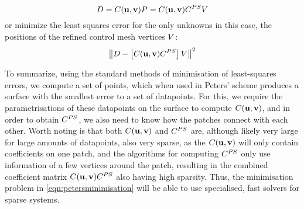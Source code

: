 \begin{equation}
\lsDataPointMatrix = \lsControlPointCoefMatrix(\vec{u},\vec{v})\lsControlPointMatrix = \lsControlPointCoefMatrix(\vec{u},\vec{v})\petersControlPointCoefMatrix\petersPatchPointMatrix
\end{equation}
or minimize the least squares error for the only unknowns in this case, the positions of the refined control mesh vertices $\petersPatchPointMatrix$:
\begin{equation}
\norm{\lsDataPointMatrix - \left [\lsControlPointCoefMatrix(\vec{u},\vec{v})\petersControlPointCoefMatrix\right ]\petersPatchPointMatrix}^2
\label{eqn:petersminimisation}
\end{equation}

To summarize, using the standard methods of minimisation of least-squares errors, we compute a set of points, which when used in Peters' scheme produces a surface with the smallest error to a set of datapoints. For this, we require the parametrisations of these datapoints on the surface to compute $\lsControlPointCoefMatrix(\vec{u},\vec{v})$, and in order to obtain $\petersControlPointCoefMatrix$, we also need to know how the patches connect with each other. 
Worth noting is that both $\lsControlPointCoefMatrix(\vec{u},\vec{v})$ and $\petersControlPointCoefMatrix$ are, although likely very large for large amounts of datapoints, also very sparse, as the $\lsControlPointCoefMatrix(\vec{u},\vec{v})$ will only contain coefficients on one patch, and the algorithms for computing $\petersControlPointCoefMatrix$ only use information of a few vertices around the patch, resulting in the combined coefficient matrix $\lsControlPointCoefMatrix(\vec{u},\vec{v})\petersControlPointCoefMatrix$ also having high sparsity. Thus, the minimisation problem in \autoref{eqn:petersminimisation} will be able to use specialised, fast solvers for sparse systems.